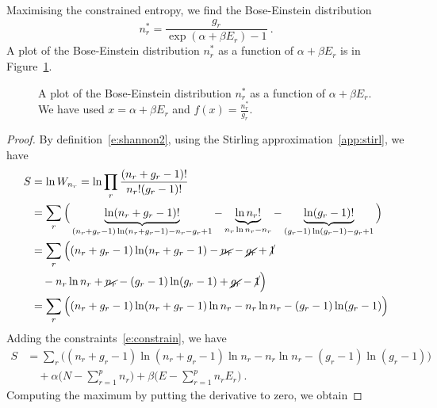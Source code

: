     Maximising the constrained entropy, we find the Bose-Einstein distribution 
    \begin{equation*}
        n_r^* = \frac{g_r}{\exp(\alpha + \beta E_r) - 1} ~.
    \end{equation*}
    A plot of the Bose-Einstein distribution $n_r^*$ as a function of $\alpha + \beta E_r$  is in Figure~\ref{en:be}.
    \begin{figure}
        \centering
        \caption{A plot of the Bose-Einstein distribution $n_r^*$ as a function of $\alpha + \beta E_r$. We have used $x = \alpha + \beta E_r $ and $f(x) = \frac{n_r^*}{g_r}$.}
        \label{en:be}
    \end{figure}
    \begin{proof}
        By definition~\eqref{e:shannon2}, using the Stirling approximation~\eqref{app:stirl}, we have
        \begin{equation*}
        \begin{aligned}
            S & = \ln W_{n_r} = \ln \prod_r \frac{(n_r + g_r - 1)!}{n_r! (g_r - 1)!} \\ & = \sum_r \Big (\underbrace{\ln (n_r + g_r - 1)!}_{(n_r + g_r - 1) \ln (n_r + g_r - 1) - n_r - g_r + 1} - \underbrace{\ln n_r!}_{n_r \ln n_r - n_r} - \underbrace{\ln (g_r - 1)!}_{(g_r - 1) \ln (g_r - 1) - g_r + 1} \Big ) \\ & = \sum_r \Big ( (n_r + g_r - 1) \ln (n_r + g_r - 1) - \cancel{n_r} - \cancel{g_r} + \cancel{1} \\ & \quad - n_r \ln n_r + \cancel{n_r }- (g_r - 1) \ln (g_r - 1) + \cancel{g_r} - \cancel{1} \Big ) \\ & = \sum_r \Big ( (n_r + g_r - 1) \ln (n_r + g_r - 1) \ln n_r - n_r \ln n_r - (g_r - 1) \ln (g_r - 1) \Big ) 
        \end{aligned}
        \end{equation*}
        Adding the constraints~\eqref{e:constrain}, we have
        \begin{equation*}
        \begin{aligned}
            S & = \sum_r \Big ( (n_r + g_r - 1) \ln (n_r + g_r - 1) \ln n_r - n_r \ln n_r - (g_r - 1) \ln (g_r - 1) \Big ) \\ & \quad + \alpha \Big (N - \sum_{r=1}^p n_r \Big) + \beta \Big (E - \sum_{r=1}^p n_r E_r \Big ) ~.
        \end{aligned}
        \end{equation*}
        Computing the maximum by putting the derivative to zero, we obtain

\end{proof}
